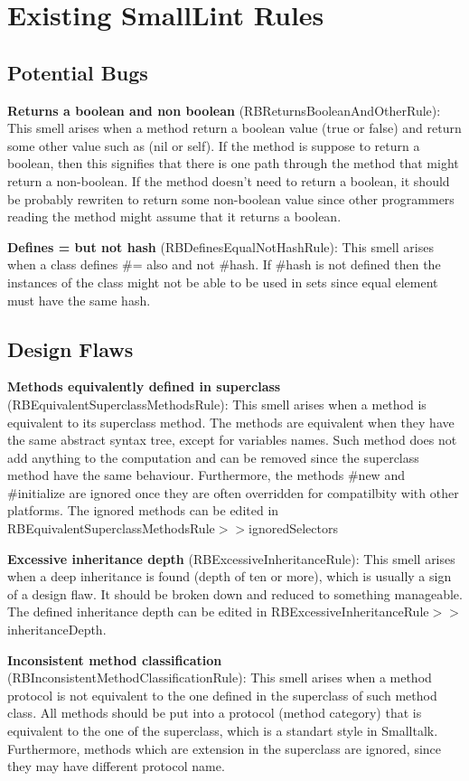 \section{Existing SmallLint Rules}
\subsection{Potential Bugs}
\textbf{Returns a boolean and non boolean} (RBReturnsBooleanAndOtherRule): This smell arises when a method return a boolean value (true or false) and return some other value such as (nil or self). If the method is suppose to return a boolean, then this signifies that there is one path through the method that might return a non-boolean. If the method doesn't need to return a boolean, it should be probably rewriten to return some non-boolean value since other programmers reading the method might assume that it returns a boolean.

\textbf{Defines = but not hash} (RBDefinesEqualNotHashRule): This smell arises when a class defines \#= also and not \#hash. If \#hash is not defined then the instances of the class might not be able to be used in sets since equal element must have the same hash.

\subsection{Design Flaws}
\textbf{Methods equivalently defined in superclass} (RBEquivalentSuperclassMethodsRule): This smell arises when a method is equivalent to its superclass method. The methods are equivalent when they have the same abstract syntax tree, except for variables names. Such method does not add anything to the computation and can be removed since the superclass method have the same behaviour. Furthermore, the methods \#new and \#initialize are ignored once they are often overridden for compatilbity with other platforms. The ignored methods can be edited in RBEquivalentSuperclassMethodsRule$>>$ignoredSelectors

\textbf{Excessive inheritance depth} (RBExcessiveInheritanceRule): This smell arises when a deep inheritance is found (depth of ten or more), which is usually a sign of a design flaw. It should be broken down and reduced to something manageable. The defined inheritance depth can be edited in RBExcessiveInheritanceRule$>>$inheritanceDepth.

\textbf{Inconsistent method classification} (RBInconsistentMethodClassificationRule): This smell arises when a method protocol is not equivalent to the one defined in the superclass of such method class. All methods should be put into a protocol (method category) that is equivalent to the one of the superclass, which is a standart style in Smalltalk. Furthermore, methods which are extension in the superclass are ignored, since they may have different protocol name.

